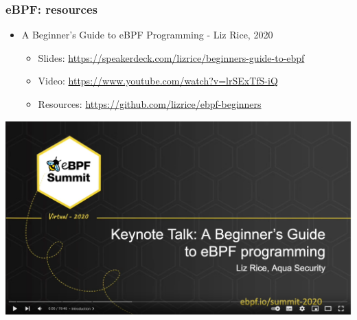 \begin{frame}
  \frametitle{eBPF: resources}
  \begin{itemize}
    \item A Beginner’s Guide to eBPF Programming - Liz Rice, 2020
    \begin{itemize}
      \item Slides: \url{https://speakerdeck.com/lizrice/beginners-guide-to-ebpf}
      \item Video: \url{https://www.youtube.com/watch?v=lrSExTfS-iQ}
      \item Resources: \url{https://github.com/lizrice/ebpf-beginners}
    \end{itemize}
  \end{itemize}
  \begin{center}
     \includegraphics[height=0.6\textheight]{slides/debugging-system-wide-profiling/ebpf_liz_rice_2020.png}
  \end{center}
\end{frame}

